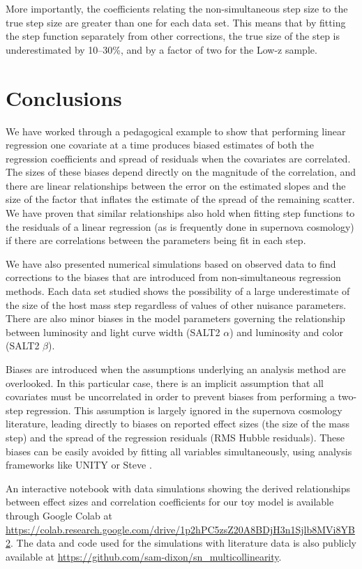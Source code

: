 More importantly, the coefficients relating the non-simultaneous step size to the true step size are greater than one for each data set. This means that by fitting the step function separately from other corrections, the true size of the step is underestimated by 10--30\%, and by a factor of two for the Low-z sample.

\section{Conclusions}
\label{sec:conclusion}
We have worked through a pedagogical example to show that performing linear regression one covariate at a time produces biased estimates of both the regression coefficients and spread of residuals when the covariates are correlated. The sizes of these biases depend directly on the magnitude of the correlation, and there are linear relationships between the error on the estimated slopes and the size of the factor that inflates the estimate of the spread of the remaining scatter. We have proven that similar relationships also hold when fitting step functions to the residuals of a linear regression (as is frequently done in supernova cosmology) if there are correlations between the parameters being fit in each step. 

We have also presented numerical simulations based on observed data to find corrections to the biases that are introduced from non-simultaneous regression methods. Each data set studied shows the possibility of a large underestimate of the size of the host mass step regardless of values of other nuisance parameters. There are also minor biases in the model parameters governing the relationship between luminosity and light curve width (SALT2 $\alpha$) and luminosity and color (SALT2 $\beta$).

Biases are introduced when the assumptions underlying an analysis method are overlooked. In this particular case, there is an implicit assumption that all covariates must be uncorrelated in order to prevent biases from performing a two-step regression. This assumption is largely ignored in the supernova cosmology literature, leading directly to biases on reported effect sizes (the size of the mass step) and the spread of the regression residuals (RMS Hubble residuals). These biases can be easily avoided by fitting all variables simultaneously, using analysis frameworks like UNITY \citep{rubin_unity_2015} or Steve \citep{hinton_steve_2019}.

An interactive notebook with data simulations showing the derived relationships between effect sizes and correlation coefficients for our toy model is available through Google Colab at \url{https://colab.research.google.com/drive/1p2hPC5zsZ20A8BDjH3n1Sjlb8MVi8YB2}. The data and code used for the simulations with literature data is also publicly available at \url{https://github.com/sam-dixon/sn_multicollinearity}.
